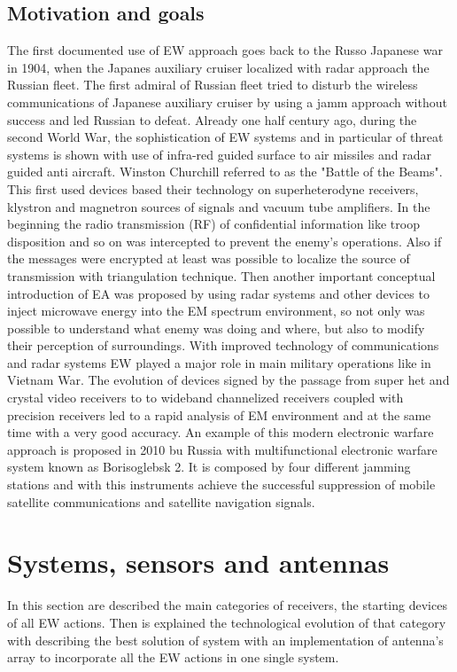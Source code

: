 \documentclass[12pt]{report}
\begin{document}
\section{Motivation and goals}
The first documented use of EW approach goes back to the Russo Japanese war in 1904, when the Japanes auxiliary cruiser localized with radar approach the Russian fleet. The first admiral of Russian fleet tried to disturb the wireless communications of Japanese auxiliary cruiser by using a jamm approach without success and led Russian to defeat. Already one half century ago, during the second World War, the sophistication of EW systems and in particular of threat systems is shown with use of infra-red guided surface to air missiles and radar guided anti aircraft. Winston Churchill referred to as the "Battle of the Beams". This first used devices based their technology on superheterodyne receivers, klystron and magnetron sources of signals and vacuum tube amplifiers. In the beginning the radio transmission (RF) of confidential information like troop disposition and so on was intercepted to prevent the enemy's operations. Also if the messages were encrypted at least was possible to localize the source of transmission with triangulation technique. Then another important conceptual introduction of EA was proposed by using radar systems and other devices to inject microwave energy into the EM spectrum environment, so not only was possible to understand what enemy was doing and where, but also to modify their perception of surroundings. With improved technology of communications and radar systems EW played a major role in main military operations like in Vietnam War. The evolution of devices signed by the passage from super het and crystal video receivers to to wideband channelized receivers coupled with precision receivers led to a rapid analysis of EM environment and at the same time with a very good accuracy. An example of this modern electronic warfare approach is proposed in 2010 bu Russia with multifunctional electronic warfare system known as Borisoglebsk 2. It is composed by four different jamming stations and with this instruments achieve the successful suppression of mobile satellite communications and satellite navigation signals. 

\newpage
\chapter{Systems, sensors and antennas} \label{Systems}
In this section are described the main categories of receivers, the starting devices of all EW actions. Then is explained the technological evolution of that category with describing the best solution of system with an implementation of antenna's array to incorporate all the EW actions in one single system. 
\end{document}
